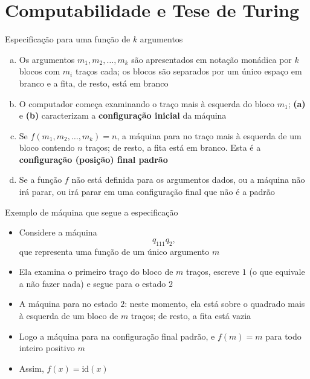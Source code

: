 \section{Computabilidade e Tese de Turing}

\begin{frame}[fragile]{Especificação para uma função de $k$ argumentos}

    \begin{enumerate}[(a)]
        \item Os argumentos $m_1, m_2, \ldots, m_k$ são apresentados em notação monádica por
            $k$ blocos com $m_i$ traços cada; os blocos são separados por um único espaço em branco
            e a fita, de resto, está em branco
        \item O computador começa examinando o traço mais à esquerda do bloco $m_1$; \textbf{(a)}
            e \textbf{(b)} caracterizam a \textbf{configuração inicial} da máquina
        \item Se $f(m_1, m_2, \ldots, m_k) = n$, a máquina para no traço mais à esquerda de um
            bloco contendo $n$ traços; de resto, a fita está em branco. Esta é a 
            \textbf{configuração (posição) final padrão}
        \item Se a função $f$ não está definida para os argumentos dados, ou a máquina não irá
            parar, ou irá parar em uma configuração final que não é a padrão
    \end{enumerate}

\end{frame}

\begin{frame}[fragile]{Exemplo de máquina que segue a especificação}

    \begin{itemize}
        \item Considere a máquina
        \[
            q_111q_2,
        \]
        que representa uma função de um único argumento $m$

        \item Ela examina o primeiro traço do bloco de $m$ traços, escreve $1$ (o que equivale
            a não fazer nada) e segue para o estado $2$

        \item A máquina para no estado $2$: neste momento, ela está sobre o quadrado mais à
            esquerda de um bloco de $m$ traços; de resto, a fita está vazia

        \item Logo a máquina para na configuração final padrão, e $f(m) = m$ para todo inteiro
            positivo $m$

        \item Assim, $f(x) = \mathrm{id}(x)$
    \end{itemize}

\end{frame}

